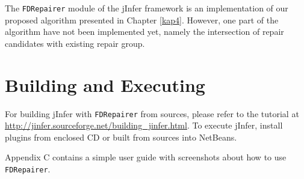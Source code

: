 The \texttt{FDRepairer} module of the jInfer framework is an implementation of our proposed algorithm presented in Chapter \ref{kap4}. However, one part of the algorithm have not been implemented yet, namely the intersection of repair candidates with existing repair group.

\section{Building and Executing}

For building jInfer with \texttt{FDRepairer} from sources, please refer to the tutorial at \url{http://jinfer.sourceforge.net/building_jinfer.html}. To execute jInfer, install plugins from enclosed CD or built from sources into NetBeans.

Appendix C contains a simple user guide with screenshots about how to use \texttt{FDRepairer}.
